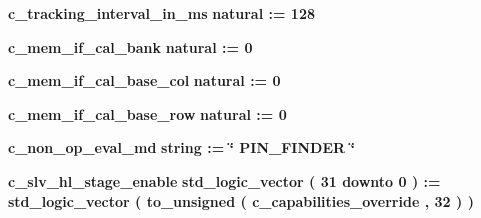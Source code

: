 \begin{DoxyCompactItemize}
\item 
{\bf c\+\_\+tracking\+\_\+interval\+\_\+in\+\_\+ms} {\bfseries \textcolor{comment}{natural}\textcolor{vhdlchar}{ }\textcolor{vhdlchar}{ }\textcolor{vhdlchar}{\+:}\textcolor{vhdlchar}{=}\textcolor{vhdlchar}{ }\textcolor{vhdlchar}{ } \textcolor{vhdldigit}{128} \textcolor{vhdlchar}{ }} 
\item 
{\bf c\+\_\+mem\+\_\+if\+\_\+cal\+\_\+bank} {\bfseries \textcolor{comment}{natural}\textcolor{vhdlchar}{ }\textcolor{vhdlchar}{ }\textcolor{vhdlchar}{\+:}\textcolor{vhdlchar}{=}\textcolor{vhdlchar}{ }\textcolor{vhdlchar}{ } \textcolor{vhdldigit}{0} \textcolor{vhdlchar}{ }} 
\item 
{\bf c\+\_\+mem\+\_\+if\+\_\+cal\+\_\+base\+\_\+col} {\bfseries \textcolor{comment}{natural}\textcolor{vhdlchar}{ }\textcolor{vhdlchar}{ }\textcolor{vhdlchar}{\+:}\textcolor{vhdlchar}{=}\textcolor{vhdlchar}{ }\textcolor{vhdlchar}{ } \textcolor{vhdldigit}{0} \textcolor{vhdlchar}{ }} 
\item 
{\bf c\+\_\+mem\+\_\+if\+\_\+cal\+\_\+base\+\_\+row} {\bfseries \textcolor{comment}{natural}\textcolor{vhdlchar}{ }\textcolor{vhdlchar}{ }\textcolor{vhdlchar}{\+:}\textcolor{vhdlchar}{=}\textcolor{vhdlchar}{ }\textcolor{vhdlchar}{ } \textcolor{vhdldigit}{0} \textcolor{vhdlchar}{ }} 
\item 
{\bf c\+\_\+non\+\_\+op\+\_\+eval\+\_\+md} {\bfseries \textcolor{comment}{string}\textcolor{vhdlchar}{ }\textcolor{vhdlchar}{ }\textcolor{vhdlchar}{\+:}\textcolor{vhdlchar}{=}\textcolor{vhdlchar}{ }\textcolor{vhdlchar}{ }\textcolor{vhdlchar}{ }\textcolor{vhdlchar}{ }\textcolor{keyword}{\char`\"{} P\+I\+N\+\_\+\+F\+I\+N\+D\+E\+R \char`\"{}}\textcolor{vhdlchar}{ }} 
\item 
{\bf c\+\_\+slv\+\_\+hl\+\_\+stage\+\_\+enable} {\bfseries \textcolor{comment}{std\+\_\+logic\+\_\+vector}\textcolor{vhdlchar}{ }\textcolor{vhdlchar}{(}\textcolor{vhdlchar}{ }\textcolor{vhdlchar}{ } \textcolor{vhdldigit}{31} \textcolor{vhdlchar}{ }\textcolor{keywordflow}{downto}\textcolor{vhdlchar}{ }\textcolor{vhdlchar}{ } \textcolor{vhdldigit}{0} \textcolor{vhdlchar}{ }\textcolor{vhdlchar}{)}\textcolor{vhdlchar}{ }\textcolor{vhdlchar}{ }\textcolor{vhdlchar}{ }\textcolor{vhdlchar}{\+:}\textcolor{vhdlchar}{=}\textcolor{vhdlchar}{ }\textcolor{vhdlchar}{ }\textcolor{vhdlchar}{ }\textcolor{vhdlchar}{ }\textcolor{comment}{std\+\_\+logic\+\_\+vector}\textcolor{vhdlchar}{ }\textcolor{vhdlchar}{(}\textcolor{vhdlchar}{ }\textcolor{vhdlchar}{to\+\_\+unsigned}\textcolor{vhdlchar}{ }\textcolor{vhdlchar}{(}\textcolor{vhdlchar}{ }\textcolor{vhdlchar}{ }\textcolor{vhdlchar}{ }\textcolor{vhdlchar}{ }{\bfseries {\bf c\+\_\+capabilities\+\_\+override}} \textcolor{vhdlchar}{ }\textcolor{vhdlchar}{,}\textcolor{vhdlchar}{ }\textcolor{vhdlchar}{ } \textcolor{vhdldigit}{32} \textcolor{vhdlchar}{ }\textcolor{vhdlchar}{)}\textcolor{vhdlchar}{ }\textcolor{vhdlchar}{ }\textcolor{vhdlchar}{ }\textcolor{vhdlchar}{)}\textcolor{vhdlchar}{ }} 

\end{DoxyCompactItemize}
